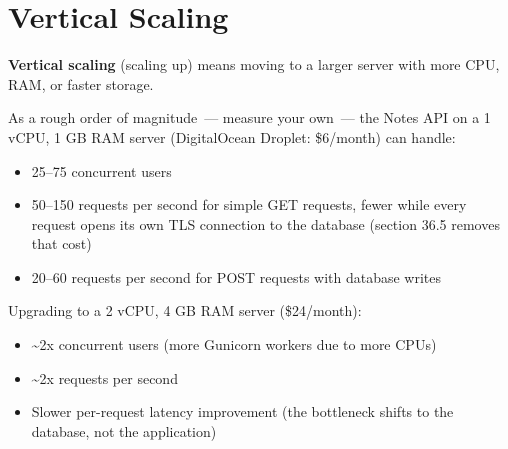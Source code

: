\begin{codebox}[short]

\begin{Shaded}
\begin{Highlighting}[]
  
 

 
\end{Highlighting}
\end{Shaded}

\end{codebox}

\setcounter{section}{2}
\section{Vertical Scaling}\label{36-scaling-load:363-vertical-scaling}

\textbf{Vertical scaling} (scaling up) means moving to a larger server with more CPU, RAM, or faster storage.

As a rough order of magnitude~--- measure your own~--- the Notes API on a 1 vCPU, 1 GB RAM server (DigitalOcean Droplet: \$6/month) can handle:

\begin{itemize}
\tightlist
\item
  25--75 concurrent users
\item
  50--150 requests per second for simple GET requests, fewer while every request opens its own TLS connection to the database (section 36.5 removes that cost)
\item
  20--60 requests per second for POST requests with database writes
\end{itemize}

\noindent{}Upgrading to a 2 vCPU, 4 GB RAM server (\$24/month):

\begin{itemize}
\tightlist
\item
  \textasciitilde2x concurrent users (more Gunicorn workers due to more CPUs)
\item
  \textasciitilde2x requests per second
\item
  Slower per-request latency improvement (the bottleneck shifts to the database, not the application)
\end{itemize}

